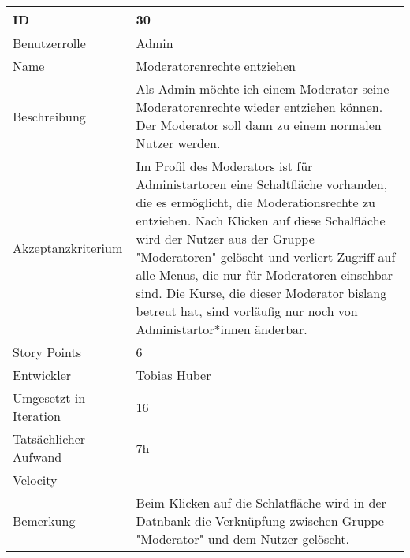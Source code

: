 \begin{tabularx}{\textwidth}{|p{}|X|}
	\hline
	ID & 30 \\
	\hline
	Benutzerrolle & Admin \\
	\hline
	Name & Moderatorenrechte entziehen\\
	\hline
	Beschreibung & Als Admin möchte ich einem Moderator seine Moderatorenrechte wieder entziehen können. Der Moderator soll dann zu einem normalen Nutzer werden. \\
	\hline
	Akzeptanzkriterium & Im Profil des Moderators ist für Administartoren eine Schaltfläche vorhanden, die es ermöglicht, die Moderationsrechte zu entziehen. Nach Klicken auf diese Schalfläche wird der Nutzer aus der Gruppe "Moderatoren" gelöscht und verliert Zugriff auf alle Menus, die nur für Moderatoren einsehbar sind. Die Kurse, die dieser Moderator bislang betreut hat, sind vorläufig nur noch von Administartor*innen änderbar. \\
	\hline
	Story Points & 6 \\
	\hline
	Entwickler & Tobias Huber \\
	\hline
	Umgesetzt in Iteration & 16\\
	\hline
	Tatsächlicher Aufwand & 7h\\
	\hline
	Velocity & \\
	\hline
	Bemerkung & Beim Klicken auf die Schlatfläche wird in der Datnbank die Verknüpfung zwischen Gruppe "Moderator" und dem Nutzer gelöscht.\\
	\hline
\end{tabularx}
\vspace{20pt}
